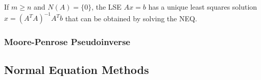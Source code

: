 \documentclass[12pt]{article}
\begin{document}
\begin{center}If $m \geq n$ and $N(A) = \{0\}$, the LSE $Ax=b$ has a unique least squares solution $x = (A^TA)^{-1}A^Tb$ that can be obtained by solving the NEQ.\end{center}
\subsubsection{Moore-Penrose Pseudoinverse}
\subsubsection{}
\subsection{Normal Equation Methods}
\end{document}
